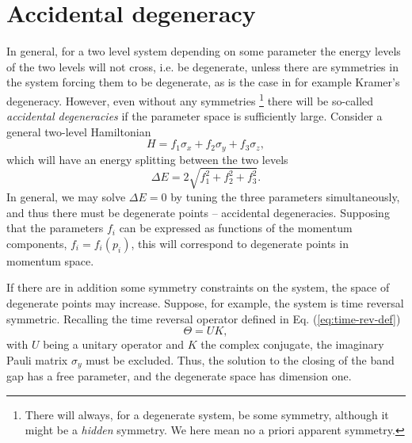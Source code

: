 \section{Accidental degeneracy}
In general, for a two level system depending on some parameter the energy levels of the two levels will not cross, i.e. be degenerate, unless there are symmetries in the system forcing them to be degenerate, as is the case in for example Kramer's degeneracy.
However, even without any symmetries
\footnote{There will always, for a degenerate system, be some symmetry, although it might be a \emph{hidden} symmetry. We here mean no a priori apparent symmetry.}
there will be so-called \emph{accidental degeneracies} if the parameter space is sufficiently large.
Consider a general two-level Hamiltonian
\begin{equation}
  H = f_1 \sigma_x + f_2 \sigma_y + f_3 \sigma_z,
\end{equation}
which will have an energy splitting between the two levels
\begin{equation}
  \Delta E = 2 \sqrt{
    f_1^2 + f_2^2 + f_3^2
  }.
\end{equation}
In general, we may solve $\Delta E = 0$ by tuning the three parameters simultaneously, and thus there must be degenerate points -- accidental degeneracies.
Supposing that the parameters $f_i$ can be expressed as functions of the momentum components, $f_i =f_i(p_i)$, this will correspond to degenerate points in momentum space.

If there are in addition some symmetry constraints on the system, the space of degenerate points may increase.
Suppose, for example, the system is time reversal symmetric.
Recalling the time reversal operator defined in Eq. (\ref{eq:time-rev-def})
$$
\Theta = UK,
$$
with $U$ being a unitary operator and $K$ the complex conjugate, the imaginary Pauli matrix $\sigma_y$ must be excluded.
Thus, the solution to the closing of the band gap has a free parameter, and the degenerate space has dimension one.
